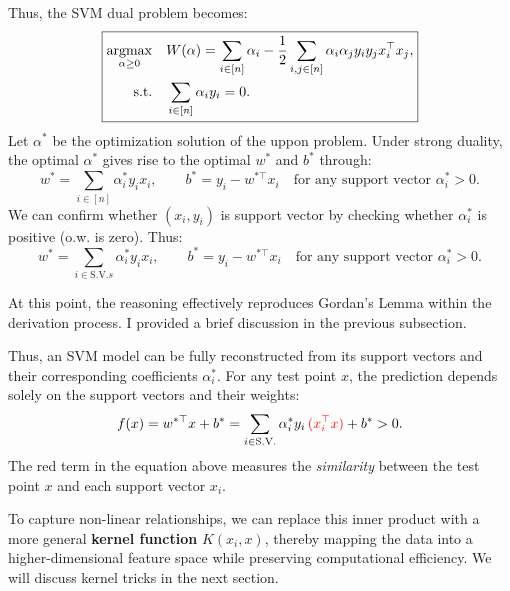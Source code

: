 \documentclass[../main]{subfiles}
\begin{document}
\begin{solution}
Thus, the SVM dual problem becomes:
\begin{equation}
    \boxed{
    \begin{aligned}
        \mathop{\mathrm{argmax}}_{\alpha \ge 0}\quad
        & W(\alpha)
        = \sum_{i \in [n]} \alpha_i
        - \frac{1}{2}
          \sum_{i,j \in [n]} \alpha_i \alpha_j y_i y_j x_i^\top x_j,\\
        \text{s.t.}\quad
        & \sum_{i \in [n]} \alpha_i y_i = 0.
    \end{aligned}}
\end{equation}
Let $\alpha^*$ be the optimization solution of the uppon problem. Under strong duality, the optimal $\alpha^*$ gives rise to the optimal $w^*$ and $b^*$ through:
\begin{equation}
    w^* = \sum_{i \in [n]} \alpha_i^* y_i x_i,
    \qquad
    b^* = y_i - w^{*\top}x_i
    \quad \text{for any support vector } \alpha_i^* > 0.
\end{equation}
We can confirm whether $(x_i,y_i)$ is support vector by checking whether $\alpha_i^*$ is positive (o.w. is zero). Thus:
\begin{equation}
    w^* = \sum_{i \in \mathrm{S.V.}s} \alpha_i^* y_i x_i,
    \qquad
    b^* = y_i - w^{*\top}x_i
    \quad \text{for any support vector } \alpha_i^* > 0.
\end{equation}
\end{solution}
\begin{note}
    At this point, the reasoning effectively reproduces Gordan’s Lemma within the derivation process. I provided a brief discussion in the previous subsection.
\end{note}
Thus, an SVM model can be fully reconstructed from its support vectors and their corresponding coefficients $\alpha_i^*$.  
For any test point $x$, the prediction depends solely on the support vectors and their weights:
\begin{equation}
    f(x) = w^{*\top}x + b^*
    = \sum_{i \in \mathrm{S.V.}} \alpha_i^* y_i \, {\color{red}(x_i^\top x)} + b^* > 0.
    \label{equ:3.57}
\end{equation}
The red term in the equation above measures the \emph{similarity} between the test point $x$ and each support vector $x_i$.  

To capture non-linear relationships, we can replace this inner product with a more general \textbf{kernel function} $K(x_i, x)$, thereby mapping the data into a higher-dimensional feature space while preserving computational efficiency. We will discuss kernel tricks in the next section.
\vspace{1em}
\end{document}
